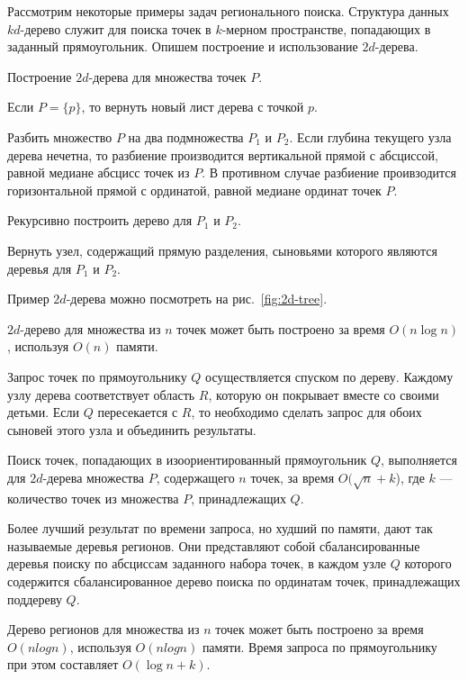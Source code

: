 Рассмотрим некоторые примеры задач регионального поиска. Структура
данных $kd$-дерево служит для поиска точек в $k$-мерном пространстве,
попадающих в заданный прямоугольник. Опишем построение и использование
$2d$-дерева.

\begin{algorithm}{Построение $2d$-дерева для множества точек $P$.}
\item Если $P = \{p\}$, то вернуть новый лист дерева с точкой $p$.
\item Разбить множество $P$ на два подмножества $P_1$ и $P_2$.
  Если глубина текущего узла дерева нечетна, то разбиение производится
  вертикальной прямой с абсциссой, равной медиане абсцисс точек из $P$.
  В противном случае разбиение проивзодится горизонтальной прямой с
  ординатой, равной медиане ординат точек $P$.
\item Рекурсивно построить дерево для $P_1$ и $P_2$.
\item Вернуть узел, содержащий прямую разделения, сыновьями которого
  являются деревья для $P_1$ и $P_2$.
\end{algorithm}
Пример $2d$-дерева можно посмотреть на рис.~\ref{fig:2d-tree}.

\begin{theorem}
  $2d$-дерево для множества из $n$ точек может быть построено за время
  $O(n \log n)$, используя $O(n)$ памяти.
\end{theorem}

Запрос точек по прямоугольнику $Q$ осуществляется спуском по дереву.
Каждому узлу дерева соответствует область $R$, которую он покрывает вместе
со своими детьми. Если $Q$ пересекается с $R$, то необходимо сделать
запрос для обоих сыновей этого узла и объединить результаты.

\begin{theorem}
  Поиск точек, попадающих в изоориентированный прямоугольник $Q$,
  выполняется для $2d$-дерева множества $P$, содержащего $n$ точек, за время
  $O(\sqrt n + k$), где $k$ --- количество точек из множества $P$,
  принадлежащих $Q$.
\end{theorem}

Более лучший результат по времени запроса, но худший по памяти, дают
так называемые деревья регионов. Они представляют собой
сбалансированные деревья поиску по абсциссам заданного набора точек, в
каждом узле $Q$ которого содержится сбалансированное дерево поиска по
ординатам точек, принадлежащих поддереву $Q$.

\begin{theorem}
  Дерево регионов для множества из $n$ точек может быть построено за
  время $O(n log n)$, используя $O(n log n)$ памяти. Время запроса по
  прямоугольнику при этом составляет $O(\log n + k)$.
\end{theorem}


